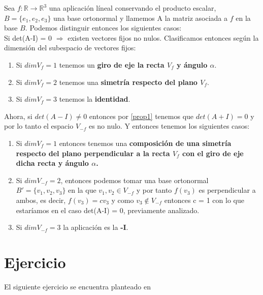 \documentclass[10pt,a4paper]{article}
\theoremstyle{mystyle}
\begin{document}
Sea $f:\mathbb{R} \rightarrow \mathbb{R}^3$ una aplicación líneal conservando el producto escalar, $B=\lbrace e_1,e_2,e_3 \rbrace$ una base ortonormal y llamemos A la matriz asociada a $f$ en la base $B$. Podemos distinguir entonces los siguientes casos:\\

Si det(A-I) = 0 $\Rightarrow$ existen vectores fijos no nulos. Clasificamos entonces según la dimensión del subespacio de vectores fijos:\\

\begin{enumerate}
\item Si $dimV_f = 1$ tenemos un \textbf{giro de eje la recta $V_f$ y ángulo $\alpha$}.
\item Si $dimV_f = 2$ tenemos una \textbf{simetría respecto del plano $V_f$}.
\item Si $dimV_f = 3$ tenemos la \textbf{identidad}.
\end{enumerate}

Ahora, si $det(A-I) \neq 0$ entonces por \ref{prop1} tenemos que $det(A+I) = 0$ y por lo tanto el espacio $V_{-f}$ es no nulo. Y entonces tenemos los siguientes casos:

\begin{enumerate}
\item Si $dimV_f = 1$ entonces tenemos una \textbf{composición de una simetría respecto del plano perpendicular a la recta $V_f$ con el giro de eje dicha recta y ángulo $\alpha$.}
\item Si $dimV_{-f} = 2$, entonces podemos tomar una base ortonormal $B' = \lbrace v_1,v_2,v_3 \rbrace$ en la que $v_1,v_2 \in V_{-f}$ y por tanto $f(v_3)$ es perpendicular a ambos, es decir, $f(v_3) = cv_3$ y como $v_3 \notin V_{-f}$ entonces c = 1 con lo que estaríamos en el caso det(A-I) = 0, previamente analizado.
\item Si $dimV_{-f} = 3$ la aplicación es la \textbf{-I}.
\end{enumerate}


\section{Ejercicio}

El siguiente ejercicio se encuentra planteado en \cite{celeste}\\

\hfill\\
\end{document}
